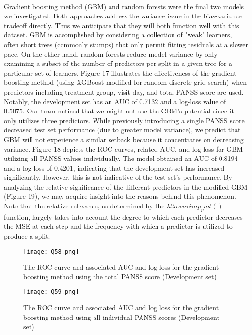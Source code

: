 \documentclass{article}
\begin{document}
 	\paragraph{}Gradient boosting method (GBM) and random forests were the final two models we investigated. Both approaches address the variance issue in the bias-variance tradeoff directly. Thus we anticipate that they will both function well with this dataset. GBM is accomplished by considering a collection of "weak" learners, often short trees (commonly stumps) that only permit fitting residuals at a slower pace. On the other hand, random forests reduce model variance by only examining a subset of the number of predictors per split in a given tree for a particular set of learners.
Figure 17 illustrates the effectiveness of the gradient boosting method (using XGBoost modified for random discrete grid search) when predictors including treatment group, visit day, and total PANSS score are used. Notably, the development set has an AUC of 0.7132 and a log-loss value of 0.5075. Our team noticed that we might not use the GBM's potential since it only utilizes three predictors. While previously introducing a single PANSS score decreased test set performance (due to greater model variance), we predict that GBM will not experience a similar setback because it concentrates on decreasing variance. Figure 18 depicts the ROC curves, related AUC, and log loss for GBM utilizing all PANSS values individually. The model obtained an AUC of 0.8194 and a log loss of 0.4201, indicating that the development set has increased significantly. However, this is not indicative of the test set's performance. By analyzing the relative significance of the different predictors in the modified GBM (Figure 19), we may acquire insight into the reasons behind this phenomenon. Note that the relative relevance, as determined by the $h2o.varimp_plot()$ function, largely takes into account the degree to which each predictor decreases the MSE at each step and the frequency with which a predictor is utilized to produce a split.
 \begin{figure}[H] 
\centering %
\texttt{[image: Q58.png]} 
\caption{ The ROC curve and associated AUC and log loss for the gradient boosting method using the total PANSS score (Development set)}
\label{R} %
\end{figure} 

\begin{figure}[H] 
\centering %
\texttt{[image: Q59.png]} 
\caption{The ROC curve and associated AUC and log loss for the gradient boosting method using all individual PANSS scores (Development set)}
\label{R} %
\end{figure}  
\end{document}
